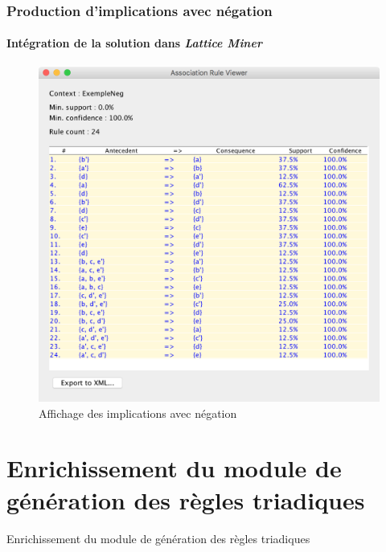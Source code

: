 \documentclass[french]{beamer}
\newcommand{\lm}{\emph{Lattice Miner}\xspace}
\begin{document}
\begin{frame}
\frametitle{Production d'implications avec négation}
\framesubtitle{Intégration de la solution dans \lm}
\begin{figure}[H]
\caption{Affichage des implications avec négation}
\label{fig:lm-neg-rules}
\begin{center}\includegraphics[scale=0.35]{figures/lm-neg-rules.png}\end{center}
\end{figure}
\end{frame}
\section[Triadique]{Enrichissement du module de génération des règles triadiques}
\begin{frame}
\large{\centerline{Enrichissement du module de génération des règles triadiques}}
\end{frame}
\end{document}
